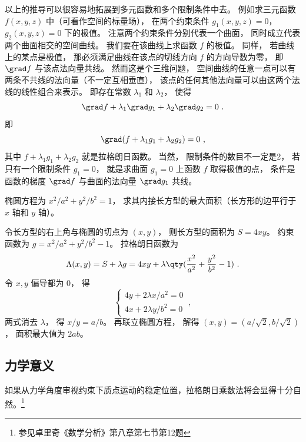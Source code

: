 以上的推导可以很容易地拓展到多元函数和多个限制条件中去。 例如求三元函数 $f(x,y,z)$ 中（可看作空间的标量场）， 在两个约束条件 $g_1(x,y,z) = 0$， $g_2(x,y,z) = 0$ 下的极值。 注意两个约束条件分别代表一个曲面， 同时成立代表两个曲面相交的空间曲线。 我们要在该曲线上求函数 $f$ 的极值。 同样， 若曲线上的某点是极值， 那必须满足曲线在该点的切线方向 $f$ 的方向导数为零， 即 $\grad f$ 与该点法向量共线。 然而这是个三维问题， 空间曲线的任意一点可以有两条不共线的法向量（不一定互相垂直）， 该点的任何其他法向量可以由这两个法线的线性组合来表示。 即存在常数 $\lambda_1$ 和 $\lambda_2$， 使得
\begin{equation}
\grad f + \lambda_1 \grad g_1 + \lambda_2 \grad g_2 = 0~.
\end{equation}
即
\begin{equation}
\grad (f + \lambda_1 g_1 + \lambda_2 g_2) = 0~,
\end{equation}
其中 $f + \lambda_1 g_1 + \lambda_2 g_2$ 就是拉格朗日函数。 当然， 限制条件的数目不一定是2， 若只有一个限制条件 $g_1 = 0$， 就是求曲面 $g_1 = 0$ 上函数 $f$ 取得极值的点， 条件是函数的梯度 $\grad f$ 与曲面的法向量 $\grad g_1$ 共线。

\begin{example}{}
椭圆方程为 $x^2/a^2 + y^2/b^2 = 1$， 求其内接长方型的最大面积（长方形的边平行于 $x$ 轴和 $y$ 轴）。

令长方型的右上角与椭圆的切点为 $(x,y)$， 则长方型的面积为 $S = 4xy$。 约束函数为 $g = x^2/a^2 + y^2/b^2 - 1$。 拉格朗日函数为
\begin{equation}
\Lambda(x,y) = S + \lambda g = 4xy + \lambda \qty(\frac{x^2}{a^2} + \frac{y^2}{b^2} - 1)~.
\end{equation}
令 $x, y$ 偏导都为 0， 得
\begin{equation}
\begin{cases}
4y + 2\lambda x/a^2 = 0\\
4x + 2\lambda y/b^2 = 0
\end{cases}~,
\end{equation}
两式消去 $\lambda$， 得 $x/y = a/b$。 再联立椭圆方程， 解得 $(x,y) = (a/\sqrt{2}, b/\sqrt{2})$， 面积最大值为 $2ab$。
\end{example}

\subsection{力学意义}

如果从力学角度审视约束下质点运动的稳定位置，拉格朗日乘数法将会显得十分自然。\footnote{参见卓里奇《数学分析》第八章第七节第12题}


